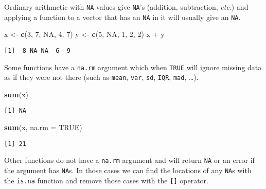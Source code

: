 \documentclass[]{book}
\newenvironment{Shaded}{\begin{snugshade}}{\end{snugshade}}
\newcommand{\KeywordTok}[1]{\textcolor[rgb]{0.13,0.29,0.53}{\textbf{{#1}}}}
\newcommand{\DataTypeTok}[1]{\textcolor[rgb]{0.13,0.29,0.53}{{#1}}}
\newcommand{\DecValTok}[1]{\textcolor[rgb]{0.00,0.00,0.81}{{#1}}}
\newcommand{\StringTok}[1]{\textcolor[rgb]{0.31,0.60,0.02}{{#1}}}
\newcommand{\OtherTok}[1]{\textcolor[rgb]{0.56,0.35,0.01}{{#1}}}
\newcommand{\NormalTok}[1]{{#1}}
\numberwithin{equation}{chapter}
\numberwithin{figure}{chapter}
\theoremstyle{plain}
\theoremstyle{definition}
\theoremstyle{remark}
\theoremstyle{definition}
\theoremstyle{definition}
\theoremstyle{remark}
\begin{document}
Ordinary arithmetic with \texttt{NA} values give \texttt{NA}'s
(addition, subtraction, \emph{etc}.) and applying a function to a vector
that has an \texttt{NA} in it will usually give an \texttt{NA}.

\begin{Shaded}
\begin{Highlighting}[]
\NormalTok{x <-}\StringTok{ }\KeywordTok{c}\NormalTok{(}\DecValTok{3}\NormalTok{, }\DecValTok{7}\NormalTok{, }\OtherTok{NA}\NormalTok{, }\DecValTok{4}\NormalTok{, }\DecValTok{7}\NormalTok{)}
\NormalTok{y <-}\StringTok{ }\KeywordTok{c}\NormalTok{(}\DecValTok{5}\NormalTok{, }\OtherTok{NA}\NormalTok{, }\DecValTok{1}\NormalTok{, }\DecValTok{2}\NormalTok{, }\DecValTok{2}\NormalTok{)}
\NormalTok{x +}\StringTok{ }\NormalTok{y}
\end{Highlighting}
\end{Shaded}

\begin{verbatim}
[1]  8 NA NA  6  9
\end{verbatim}

Some functions have a \texttt{na.rm} argument which when \texttt{TRUE}
will ignore missing data as if they were not there (such as
\texttt{mean}, \texttt{var}, \texttt{sd}, \texttt{IQR}, \texttt{mad},
\ldots{}).

\begin{Shaded}
\begin{Highlighting}[]
\KeywordTok{sum}\NormalTok{(x)}
\end{Highlighting}
\end{Shaded}

\begin{verbatim}
[1] NA
\end{verbatim}

\begin{Shaded}
\begin{Highlighting}[]
\KeywordTok{sum}\NormalTok{(x, }\DataTypeTok{na.rm =} \OtherTok{TRUE}\NormalTok{)}
\end{Highlighting}
\end{Shaded}

\begin{verbatim}
[1] 21
\end{verbatim}

Other functions do not have a \texttt{na.rm} argument and will return
\texttt{NA} or an error if the argument has \texttt{NA}s. In those cases
we can find the locations of any \texttt{NA}s with the \texttt{is.na}
function and remove those cases with the \texttt{{[}{]}} operator.
\end{document}
